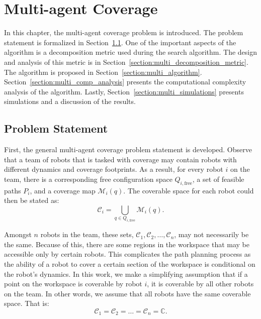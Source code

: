 \documentclass[../main.tex]{subfiles}
\begin{document}
\chapter{Multi-agent Coverage}
\label{chapter:multi_agent_coverage}

In this chapter, the multi-agent coverage problem is introduced. The problem statement is formalized in Section~\ref{section:multi_agent_problem_statement}. One of the important aspects of the algorithm is a decomposition metric used during the search algorithm. The design and analysis of this metric is in Section~\ref{section:multi_decomposition_metric}. The algorithm is proposed in Section~\ref{section:multi_algorithm}. Section~\ref{section:multi_comp_analysis} presents the computational complexity analysis of the algorithm. Lastly, Section~\ref{section:multi_simulations} presents simulations and a discussion of the results.


\section{Problem Statement}
\label{section:multi_agent_problem_statement}

First, the general multi-agent coverage problem statement is developed. Observe that a team of robots that is tasked with coverage may contain robots with different dynamics and coverage footprints. As a result, for every robot $i$ on the team, there is a corresponding free configuration space $Q_{i,\text{free}}$, a set of feasible paths $P_i$, and a coverage map $\mathcal{M}_i(q)$.  The coverable space for each robot could then be stated as:
\begin{equation}
	\mathcal{C}_i=\bigcup_{q\in Q_{i,\text{free}}}\mathcal{M}_i(q).
\end{equation}

Amongst $n$ robots in the team, these sets, $\mathcal{C}_1, \mathcal{C}_2,\ldots,\mathcal{C}_n$, may not necessarily be the same. Because of this, there are some regions in the workspace that may be accessible only by certain robots. This complicates the path planning process as the ability of a robot to cover a certain section of the workspace is conditional on the robot's dynamics. In this work, we make a simplifying assumption that if a point on the workspace is coverable by robot $i$, it is coverable by all other robots on the team. In other words, we assume that all robots have the same coverable space. That is:
\begin{equation}
	\mathcal{C}_1=\mathcal{C}_2=\ldots=\mathcal{C}_n=\mathbb{C}.
\end{equation}
\end{document}
